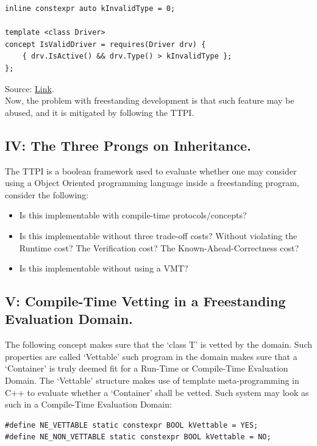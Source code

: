 \documentclass[11pt, a4paper]{article}
\begin{document}
{{\begin{lstlisting}
inline constexpr auto kInvalidType = 0;

template <class Driver>
concept IsValidDriver = requires(Driver drv) {
	{ drv.IsActive() && drv.Type() > kInvalidType };
};
\end{lstlisting} Source: \href{https://github.com/ne-foss-org/nekernel/blob/develop/src/libDDK/DriverKit/c%2B%2B/driver_base.h}{Link}.\\ Now, the problem with freestanding development is that such feature may be abused, and it is mitigated by following the TTPI.

\subsection{IV: The Three Prongs on Inheritance.}

The TTPI is a boolean framework used to evaluate whether one may consider using a Object Oriented programming language inside a freestanding program, consider the following:

\begin{itemize}
\item[1:] Is this implementable with compile-time protocols/concepts?
\item[2:] Is this implementable without three trade-off costs?
	\subitem Without violating the Runtime cost?
	\subitem The Verification cost?
	\subitem The Known-Ahead-Correctness cost?
\item[3:] Is this implementable without using a VMT?
\end{itemize}
}

\subsection{V: Compile-Time Vetting in a Freestanding Evaluation Domain.}

The following concept makes sure that the `class T' is vetted by the domain. Such properties are called `Vettable' such program in the domain makes sure that a `Container' is truly deemed fit for a Run-Time or Compile-Time Evaluation Domain. The `Vettable' structure makes use of template meta-programming in C++ to evaluate whether a `Container' shall be vetted. Such system may look as such in a Compile-Time Evaluation Domain:

\begin{lstlisting}
#define NE_VETTABLE static constexpr BOOL kVettable = YES;
#define NE_NON_VETTABLE static constexpr BOOL kVettable = NO;


\end{lstlisting}}
\end{document}

